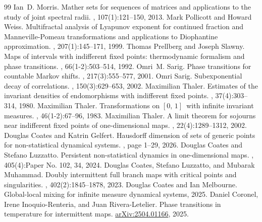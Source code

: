 \documentclass[10pt,a4paper]{amsart}
\numberwithin{equation}{section} %
\numberwithin{figure}{section} %
\renewcommand{\=}{\coloneqq}
\begin{document}
\begin{thebibliography}{99}
 Ian~D. Morris. \newblock Mather sets for sequences of matrices and applications to the study of joint spectral radii. , 107(1):121--150, 2013.
 Mark Pollicott and Howard Weiss. \newblock Multifractal analysis of {L}yapunov exponent for continued fraction and {M}anneville-{P}omeau transformations and applications to {D}iophantine approximation. , 207(1):145--171, 1999.
 Thomas Prellberg and Joseph Slawny. \newblock Maps of intervals with indifferent fixed points: thermodynamic formalism and phase transitions. , 66(1-2):503--514, 1992.
 Omri~M. Sarig. \newblock Phase transitions for countable {M}arkov shifts. , 217(3):555--577, 2001.
 Omri Sarig. \newblock Subexponential decay of correlations. , 150(3):629--653, 2002.
 Maximilian Thaler. \newblock Estimates of the invariant densities of endomorphisms with indifferent fixed points. , 37(4):303--314, 1980.
 Maximilian Thaler. \newblock Transformations on {$[0,\,1]$}\ with infinite invariant measures. , 46(1-2):67--96, 1983.
 Maximilian Thaler. \newblock A limit theorem for sojourns near indifferent fixed points of one-dimensional maps. , 22(4):1289--1312, 2002.
 Douglas Coates and Katrin Gelfert. \newblock Hausdorff dimension of sets of generic points for non-statistical dynamical systems. , page 1–29, 2026.
 Douglas Coates and Stefano Luzzatto. \newblock Persistent non-statistical dynamics in one-dimensional maps. , 405(4):Paper No. 102, 34, 2024.
 Douglas Coates, Stefano Luzzatto, and Mubarak Muhammad. \newblock Doubly intermittent full branch maps with critical points and singularities. , 402(2):1845--1878, 2023.
 Douglas Coates and Ian Melbourne. \newblock Global-local mixing for infinite measure dynamical systems, 2025.
 Daniel Coronel, Irene Inoquio-Renteria, and Juan Rivera-Letelier. \newblock Phase transitions in temperature for intermittent maps. \newblock \href{https://arxiv.org/abs/2504.01166} {arXiv:2504.01166}, 2025.

\end{thebibliography}
\end{document}
